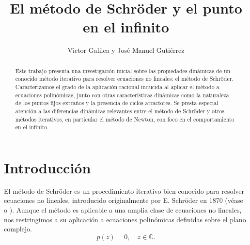 \IfFileExists{aims.cls}{\documentclass{aims}}{\documentclass[11pt]{article}}
\numberwithin{equation}{section}
\theoremstyle{thmstyleone}%
\theoremstyle{thmstyletwo}%
\theoremstyle{thmstylethree}%
\begin{document}
\title{El método de Schr\"oder y el punto en el infinito}

\author{%
 V{\'\i}ctor Galilea 
  y
Jos\'e Manuel Guti\'errez\corrauth
}


\address{%
{Department of Mathematics and Computer Sciences, Universidad de La Rioja, C/ Madre de Dios, 53, Logro\~no, 26006, La Rioja, Spain}}


\begin{abstract}
Este trabajo presenta una investigación inicial sobre las propiedades dinámicas de un conocido método iterativo para resolver ecuaciones no lineales: el método de Schröder. Caracterizamos el grado de la aplicación racional inducida al aplicar el método a ecuaciones polinómicas, junto con otras características dinámicas como la naturaleza de los puntos fijos extraños y la presencia de ciclos atractores. Se presta especial atención a las diferencias dinámicas relevantes entre el método de Schröder y otros métodos iterativos, en particular el método de Newton, con foco en el comportamiento en el infinito.
\end{abstract}


\maketitle


\section{Introducción}
El método de Schr\"oder es un procedimiento iterativo bien conocido para resolver ecuaciones no lineales, introducido originalmente por E. Schr\"oder en 1870 (véase \cite{1Sch} o \cite{2Stw}). Aunque el método es aplicable a una amplia clase de ecuaciones no lineales, nos restringimos a su aplicación a ecuaciones polinómicas definidas sobre el plano complejo.
\begin{equation}\label{eq1}
p(z)=0,\quad z\in\mathbb{C}.
\end{equation}
\end{document}
